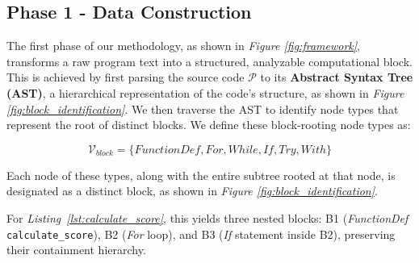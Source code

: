 \subsection{Phase 1 - Data Construction}
\noindent
The first phase of our methodology, as shown in \textit{Figure \ref{fig:framework}}, transforms a raw program text into a structured, analyzable computational block. This is achieved by first parsing the source code \(\mathcal{P}\) to its \textbf{Abstract Syntax Tree (AST)}, a hierarchical representation of the code's structure\cite{Aho1986CompilersPT, sun2023abstractsyntaxtreeprogramming}, as shown in \textit{Figure \ref{fig:block_identification}}. We then traverse the AST to identify node types that represent the root of distinct blocks. We define these block-rooting node types as:

\[ \mathcal{V}_{block} = \{FunctionDef, For, While, If, Try, With\} \]

Each node of these types, along with the entire subtree rooted at that node, is designated as a distinct block, as shown in \textit{Figure \ref{fig:block_identification}}. 



For \textit{Listing~\ref{lst:calculate_score}}, this yields three nested blocks: B1 (\textit{FunctionDef} \texttt{calculate\_score}), B2 (\textit{For} loop), and B3 (\textit{If} statement inside B2), preserving their containment hierarchy.

